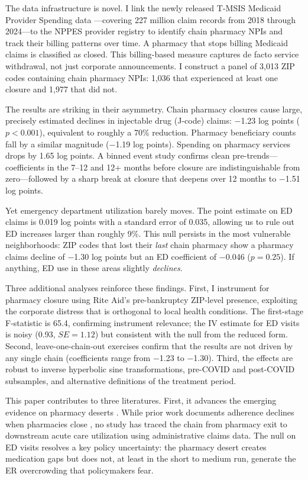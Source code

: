 \documentclass[12pt]{article}
\begin{document}
The data infrastructure is novel. I link the newly released T-MSIS Medicaid Provider Spending data \citep{cms2026tmsis}---covering 227 million claim records from 2018 through 2024---to the NPPES provider registry \citep{cms2026nppes} to identify chain pharmacy NPIs and track their billing patterns over time. A pharmacy that stops billing Medicaid claims is classified as closed. This billing-based measure captures de facto service withdrawal, not just corporate announcements. I construct a panel of 3,013 ZIP codes containing chain pharmacy NPIs: 1,036 that experienced at least one closure and 1,977 that did not.

The results are striking in their asymmetry. Chain pharmacy closures cause large, precisely estimated declines in injectable drug (J-code) claims: $-$1.23 log points ($p < 0.001$), equivalent to roughly a 70\% reduction. Pharmacy beneficiary counts fall by a similar magnitude ($-$1.19 log points). Spending on pharmacy services drops by 1.65 log points. A binned event study confirms clean pre-trends---coefficients in the 7--12 and 12+ months before closure are indistinguishable from zero---followed by a sharp break at closure that deepens over 12 months to $-$1.51 log points.

Yet emergency department utilization barely moves. The point estimate on ED claims is 0.019 log points with a standard error of 0.035, allowing us to rule out ED increases larger than roughly 9\%. This null persists in the most vulnerable neighborhoods: ZIP codes that lost their \textit{last} chain pharmacy show a pharmacy claims decline of $-$1.30 log points but an ED coefficient of $-$0.046 ($p = 0.25$). If anything, ED use in these areas slightly \textit{declines}.

Three additional analyses reinforce these findings. First, I instrument for pharmacy closure using Rite Aid's pre-bankruptcy ZIP-level presence, exploiting the corporate distress that is orthogonal to local health conditions. The first-stage F-statistic is 65.4, confirming instrument relevance; the IV estimate for ED visits is noisy (0.93, $SE = 1.12$) but consistent with the null from the reduced form. Second, leave-one-chain-out exercises confirm that the results are not driven by any single chain (coefficients range from $-$1.23 to $-$1.30). Third, the effects are robust to inverse hyperbolic sine transformations, pre-COVID and post-COVID subsamples, and alternative definitions of the treatment period.

This paper contributes to three literatures. First, it advances the emerging evidence on pharmacy deserts \citep{qato2019pharmacy, hirth2021pharmacy, look2023retail, alexander2020retail}. While prior work documents adherence declines when pharmacies close \citep{erixson2023pharmacy, anderson2020pharmacy}, no study has traced the chain from pharmacy exit to downstream acute care utilization using administrative claims data. The null on ED visits resolves a key policy uncertainty: the pharmacy desert creates medication gaps but does not, at least in the short to medium run, generate the ER overcrowding that policymakers fear.
\end{document}
